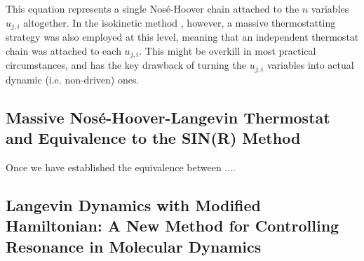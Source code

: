 \documentclass[
aip,
jcp,
reprint,
]{revtex4-1}
\begin{document}
This equation represents a single Nos\'{e}-Hoover chain attached to the $n$ variables $u_{j, i}$ altogether.
In the isokinetic method \cite{Minary_2004}, however, a massive thermostatting strategy was also employed at this level, meaning that an independent thermostat chain was attached to each $u_{j, i}$.
This might be overkill in most practical circumstances, and has the key drawback of turning the $u_{j, i}$ variables into actual dynamic (i.e. non-driven) ones.

\subsection{Massive Nos\'{e}-Hoover-Langevin Thermostat and Equivalence to the SIN(R) Method}

Once we have established the equivalence between ....

\subsection{Langevin Dynamics with Modified Hamiltonian: A New Method for Controlling Resonance in Molecular Dynamics}
\end{document}
